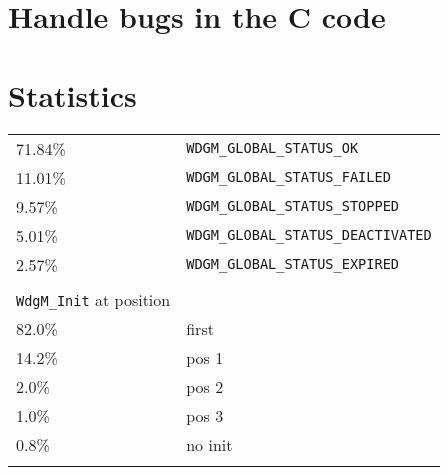 \section{Handle bugs in the C code}
\label{sec:handlebugs}

\section{Statistics}
\begin{longtable}{l l}
71.84\% & \verb!WDGM_GLOBAL_STATUS_OK!\\
11.01\% & \verb!WDGM_GLOBAL_STATUS_FAILED!\\
9.57\% & \verb!WDGM_GLOBAL_STATUS_STOPPED!\\
5.01\% & \verb!WDGM_GLOBAL_STATUS_DEACTIVATED!\\
2.57\% & \verb!WDGM_GLOBAL_STATUS_EXPIRED!\\\\

\verb!WdgM_Init! at position\\
82.0\% & first\\
14.2\% & pos 1\\
2.0\% & pos 2\\
1.0\% & pos 3\\
0.8\% & no init\\\\


\end{longtable}
